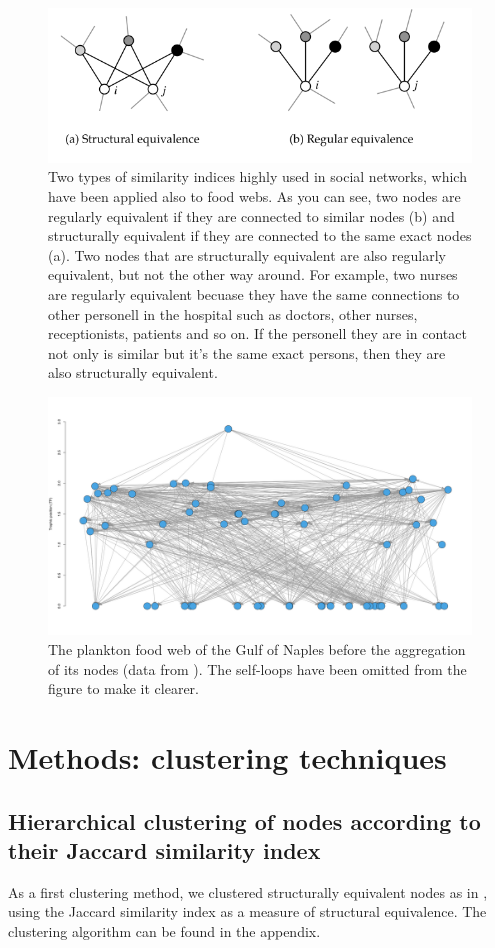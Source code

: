\documentclass[twocolumn]{article}
\begin{document}
	\begin{figure}[htbp]%
		\centering
		\includegraphics[width=.8\linewidth]{reg_struct_equivalence}
		\caption{Two types of similarity indices highly used in social networks, which have been applied also to food webs. As you can see, two nodes are regularly equivalent if they are connected to similar nodes (b) and structurally equivalent if they are connected to the same exact nodes (a). Two nodes that are structurally equivalent are also regularly equivalent, but not the other way around. For example, two nurses are regularly equivalent becuase they have the same connections to other personell in the hospital such as doctors, other nurses, receptionists, patients and so on. If the personell they are in contact not only is similar but it's the same exact persons, then they are also structurally equivalent.}
		\label{fig:equivalences}
	\end{figure}
	\begin{figure}[htbp]%
		\centering
		\includegraphics[width=.8\linewidth]{original_food_web.png}
		\caption{The plankton food web of the Gulf of Naples before the aggregation of its nodes (data from \citet{DAlelio2016}). The self-loops have been omitted from the figure to make it clearer.}
		\label{fig:originalweb}
	\end{figure}
\section*{Methods: clustering techniques}
	\subsection*{Hierarchical clustering of nodes according to their Jaccard similarity index}
	As a first clustering method, we clustered structurally equivalent nodes as in \citet{Yodzis1999}, using the Jaccard similarity index as a measure of structural equivalence. The clustering algorithm can be found in the appendix.
\end{document}
